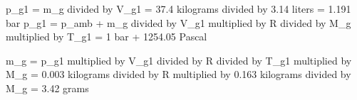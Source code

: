 p_g1 = m_g divided by V_g1 = 37.4 kilograms divided by 3.14 liters = 1.191 bar  
p_g1 = p_amb + m_g divided by V_g1 multiplied by R divided by M_g multiplied by T_g1 = 1 bar + 1254.05 Pascal  

m_g = p_g1 multiplied by V_g1 divided by R divided by T_g1 multiplied by M_g = 0.003 kilograms divided by R multiplied by 0.163 kilograms divided by M_g = 3.42 grams